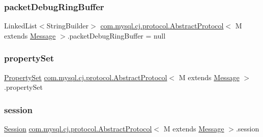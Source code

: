 \subsubsection{\texorpdfstring{packet\+Debug\+Ring\+Buffer}{packetDebugRingBuffer}}
{\footnotesize\ttfamily Linked\+List$<$String\+Builder$>$ \mbox{\hyperlink{classcom_1_1mysql_1_1cj_1_1protocol_1_1_abstract_protocol}{com.\+mysql.\+cj.\+protocol.\+Abstract\+Protocol}}$<$ M extends \mbox{\hyperlink{interfacecom_1_1mysql_1_1cj_1_1protocol_1_1_message}{Message}} $>$.packet\+Debug\+Ring\+Buffer = null\hspace{0.3cm}{\ttfamily [protected]}}

\mbox{\label{classcom_1_1mysql_1_1cj_1_1protocol_1_1_abstract_protocol_a54dc78f51d6cf3388dfbee5b36814382}} 
\subsubsection{\texorpdfstring{property\+Set}{propertySet}}
{\footnotesize\ttfamily \mbox{\hyperlink{interfacecom_1_1mysql_1_1cj_1_1conf_1_1_property_set}{Property\+Set}} \mbox{\hyperlink{classcom_1_1mysql_1_1cj_1_1protocol_1_1_abstract_protocol}{com.\+mysql.\+cj.\+protocol.\+Abstract\+Protocol}}$<$ M extends \mbox{\hyperlink{interfacecom_1_1mysql_1_1cj_1_1protocol_1_1_message}{Message}} $>$.property\+Set\hspace{0.3cm}{\ttfamily [protected]}}

\mbox{\label{classcom_1_1mysql_1_1cj_1_1protocol_1_1_abstract_protocol_a6ec300f5f577fdb6d042e361b7b5c0f6}} 
\subsubsection{\texorpdfstring{session}{session}}
{\footnotesize\ttfamily \mbox{\hyperlink{interfacecom_1_1mysql_1_1cj_1_1_session}{Session}} \mbox{\hyperlink{classcom_1_1mysql_1_1cj_1_1protocol_1_1_abstract_protocol}{com.\+mysql.\+cj.\+protocol.\+Abstract\+Protocol}}$<$ M extends \mbox{\hyperlink{interfacecom_1_1mysql_1_1cj_1_1protocol_1_1_message}{Message}} $>$.session\hspace{0.3cm}{\ttfamily [protected]}}

